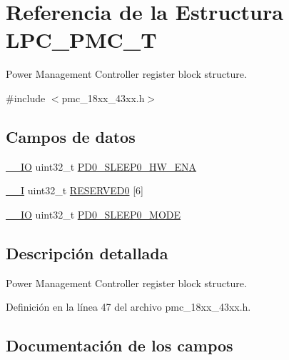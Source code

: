 \hypertarget{struct_l_p_c___p_m_c___t}{}\section{Referencia de la Estructura L\+P\+C\+\_\+\+P\+M\+C\+\_\+T}
\label{struct_l_p_c___p_m_c___t}


Power Management Controller register block structure.  




{\ttfamily \#include $<$pmc\+\_\+18xx\+\_\+43xx.\+h$>$}

\subsection*{Campos de datos}
\begin{DoxyCompactItemize}
\item 
\hyperlink{core__sc300_8h_aec43007d9998a0a0e01faede4133d6be}{\+\_\+\+\_\+\+IO} uint32\+\_\+t \hyperlink{struct_l_p_c___p_m_c___t_a179694e15b55b5bc4d82b43a61f6def6}{P\+D0\+\_\+\+S\+L\+E\+E\+P0\+\_\+\+H\+W\+\_\+\+E\+NA}
\item 
\hyperlink{core__sc300_8h_af63697ed9952cc71e1225efe205f6cd3}{\+\_\+\+\_\+I} uint32\+\_\+t \hyperlink{struct_l_p_c___p_m_c___t_a68314c84c664e7f67d241a789299ceee}{R\+E\+S\+E\+R\+V\+E\+D0} \mbox{[}6\mbox{]}
\item 
\hyperlink{core__sc300_8h_aec43007d9998a0a0e01faede4133d6be}{\+\_\+\+\_\+\+IO} uint32\+\_\+t \hyperlink{struct_l_p_c___p_m_c___t_a316f4f2e318a0caf15cb8e2f9fa51ab4}{P\+D0\+\_\+\+S\+L\+E\+E\+P0\+\_\+\+M\+O\+DE}
\end{DoxyCompactItemize}


\subsection{Descripción detallada}
Power Management Controller register block structure. 

Definición en la línea 47 del archivo pmc\+\_\+18xx\+\_\+43xx.\+h.



\subsection{Documentación de los campos}
